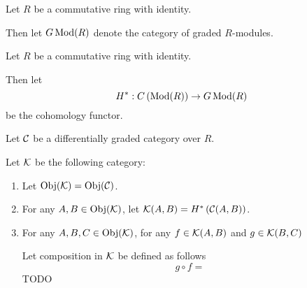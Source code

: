 \begin{notation}
    Let \( R \) be a commutative ring with identity.

    Then let \( G \operatorname{Mod}(R) \) denote the category of graded \( R \)-modules.
\end{notation}

\begin{notation}
    Let \( R \) be a commutative ring with identity.

    Then let
    \[
        H^*: C \left( \operatorname{Mod}(R) \right) \to G \operatorname{Mod}(R)
    \]
    be the cohomology functor.
\end{notation}



\begin{definition}
    Let \( {\mathcal{C}} \) be a differentially graded category over \( R \).

    Let \( {\mathcal{K}} \) be the following category:
    \begin{enumerate}
        \item Let \( \operatorname{Obj}({\mathcal{K}}) = \operatorname{Obj}({\mathcal{C}}) \).
        \item For any \( A, B \in \operatorname{Obj}({\mathcal{K}}) \), let \( {\mathcal{K}}(A, B) = H^* \left( {\mathcal{C}}(A, B) \right) \).
        \item {
            For any \( A, B, C \in \operatorname{Obj}({\mathcal{K}}) \), for any \( f \in {\mathcal{K}}(A, B) \) and \( g \in {\mathcal{K}}(B, C) \)

            Let composition in \( {\mathcal{K}} \) be defined as follows
            \[
                g \circ f = 
            \]
            TODO
        }
    \end{enumerate}
\end{definition}

